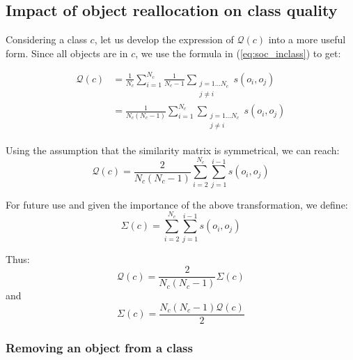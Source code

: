 \documentclass[10pt,journal,compsoc]{IEEEtran}
\begin{document}
\subsection{Impact of object reallocation on class quality}

Considering a class $c$, let us develop the expression of $\mathcal{Q}(c)$ into a more useful form. Since all objects are in $c$, we use the formula in (\ref{eq:soc_inclass}) to get:

\begin{equation}
  \begin{aligned}
    \mathcal{Q}\left(c\right) & = \frac{1}{N_c} \sum_{i=1}^{N_c} \frac{1}{N_c-1} \sum_{\substack{j=1 \ldots N_c\\j \neq i}} s\left(o_i, o_j\right) \\
                              & = \frac{1}{N_c(N_c-1)} \sum_{i=1}^{N_c} \sum_{\substack{j=1 \ldots N_c\\j \neq i}} s\left(o_i, o_j\right)
  \end{aligned}
\end{equation}

Using the assumption that the similarity matrix is symmetrical, we can reach: %
\begin{equation}
    \mathcal{Q}\left(c\right) = \frac{2}{N_c(N_c-1)} \sum_{i=2}^{N_c} \sum_{j=1}^{i-1} s\left(o_i, o_j\right)
    \label{eq:classQuality}
\end{equation}

For future use and given the importance of the above transformation, we define:
\begin{equation}
  \Sigma(c) = \sum_{i=2}^{N_c} \sum_{j=1}^{i-1} s\left(o_i, o_j\right)
\end{equation}

Thus:
\begin{equation}
    \mathcal{Q}\left(c\right) = \frac{2}{N_c(N_c-1)}\Sigma(c) 
\end{equation}
and
\begin{equation}
\Sigma(c) = \frac{N_c(N_c-1)\mathcal{Q}\left(c\right)}{2}
\end{equation}

\subsubsection{Removing an object from a class}
\end{document}
